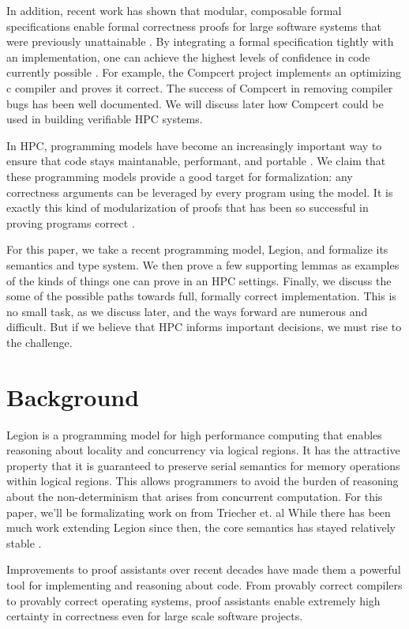 \documentclass[sigconf]{acmart}
\begin{document}
In addition, recent work has shown that modular, composable formal
specifications enable formal correctness proofs for large software systems that
were previously unattainable \cite{?}. By integrating a formal specification
tightly with an implementation, one can achieve the highest levels of
confidence in code currently possible \cite{?}. For example, the Compcert
project implements an optimizing c compiler and proves it correct. The success
of Compcert in removing compiler bugs has been well documented. We will discuss
later how Compcert could be used in building verifiable HPC systems.

In HPC, programming models have become an increasingly important way to ensure
that code stays maintanable, performant, and portable \cite{?}. We claim that
these programming models provide a good target for formalization: any
correctness arguments can be leveraged by every program using the model. It is
exactly this kind of modularization of proofs that has been so successful in
proving programs correct \cite{?}.

For this paper, we take a recent programming model, Legion, and formalize its
semantics and type system. We then prove a few supporting lemmas as examples of
the kinds of things one can prove in an HPC settings. Finally, we discuss the
some of the possible paths towards full, formally correct implementation. This
is no small task, as we discuss later, and the ways forward are numerous and
difficult. But if we believe that HPC informs important decisions, we must
rise to the challenge.

\section{Background}

Legion is a programming model for high performance computing that enables
reasoning about locality and concurrency via logical regions. It has the
attractive property that it is guaranteed to preserve serial semantics for
memory operations within logical regions. This allows programmers to avoid the
burden of reasoning about the non-determinism that arises from concurrent
computation. For this paper, we'll be formalizating work on from Triecher et.
al \cite{ooplsa13} While there has been much work extending Legion since then,
the core semantics has stayed relatively stable \cite{regent, deppart}.

Improvements to proof assistants over recent decades have made them a powerful
tool for implementing and reasoning about code. From provably correct compilers
to provably correct operating systems, proof assistants enable extremely high
certainty in correctness even for large scale software projects. 
\end{document}
